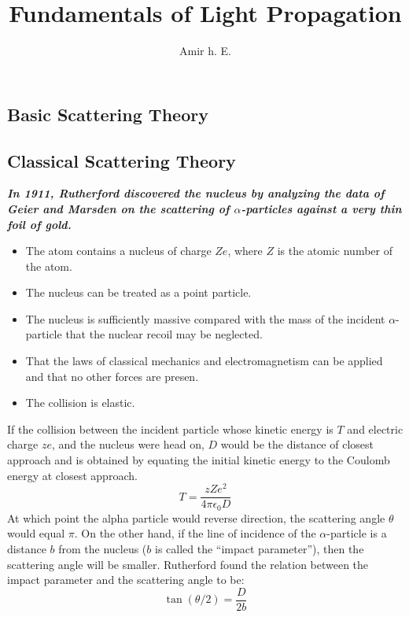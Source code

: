 \documentclass[10pt,a4paper]{report}
\author{Amir h. E.}
\title{Fundamentals of Light Propagation}
\begin{document}
	\maketitle
	\newpage
		\begin{}
		\section{Basic Scattering Theory}
			\subsection{Classical Scattering Theory}

				\textbf{\textit{In 1911, Rutherford discovered the nucleus by analyzing the data of Geier and Marsden on the scattering of $\alpha$-particles against a very thin foil of gold.}}
					\begin{itemize}
						\item The atom contains a nucleus of charge $Ze$, where $Z$ is the atomic number of the atom.
						\item The nucleus can be treated as a point particle.
						\item The nucleus is sufficiently massive compared with the mass of the incident $\alpha$-particle that the nuclear recoil may be neglected.
						\item That the laws of classical mechanics and electromagnetism can be applied and that no other forces are presen.
						\item The collision is elastic.
					\end{itemize}
				If the collision between the incident particle whose kinetic energy is $T $ and electric charge $ze$, and the nucleus were head on, $D$ would be the distance of closest approach and is obtained by equating the initial kinetic energy to the Coulomb energy at closest approach.
				\begin{equation}
				T = \frac{zZe^2}{4\pi\epsilon_0D}
				\end{equation}
				At which point the alpha particle would reverse direction, the scattering angle $\theta$ would equal $\pi$. On the other hand, if the line of incidence of the $\alpha$-particle is a distance $b$ from the nucleus ($b$ is called the “impact parameter”), then the scattering angle will be smaller. Rutherford found the relation between the impact parameter and the scattering angle to be:
				\begin{equation}
				\tan(\theta/2) = \frac{D}{2b}
				\end{equation}

\end{}
\end{document}

